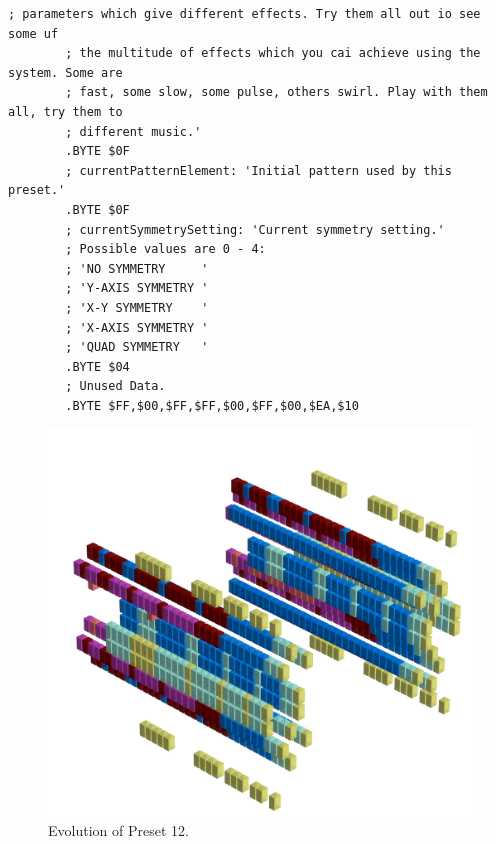\begin{lstlisting}[basicstyle=\ttfamily\tiny,caption=Source code for Preset 11.]
        ; parameters which give different effects. Try them all out io see some uf
        ; the multitude of effects which you cai achieve using the system. Some are
        ; fast, some slow, some pulse, others swirl. Play with them all, try them to
        ; different music.'
        .BYTE $0F
        ; currentPatternElement: 'Initial pattern used by this preset.'
        .BYTE $0F
        ; currentSymmetrySetting: 'Current symmetry setting.'
        ; Possible values are 0 - 4:
        ; 'NO SYMMETRY     '
        ; 'Y-AXIS SYMMETRY '
        ; 'X-Y SYMMETRY    '
        ; 'X-AXIS SYMMETRY '
        ; 'QUAD SYMMETRY   '
        .BYTE $04
        ; Unused Data.
        .BYTE $FF,$00,$FF,$FF,$00,$FF,$00,$EA,$10
\end{lstlisting}


\clearpage                                                                 
\begin{figure}[H]                                                          
    \centering                                                             
    \begin{adjustbox}{width=14cm,center}                                   
      \includegraphics[width=14cm]{src/presets/pattern12-45.png}%
    \end{adjustbox}                                                        
\caption{Evolution of Preset 12.}                                           
\end{figure}                                                               
\clearpage                                                                 
                                                                           
